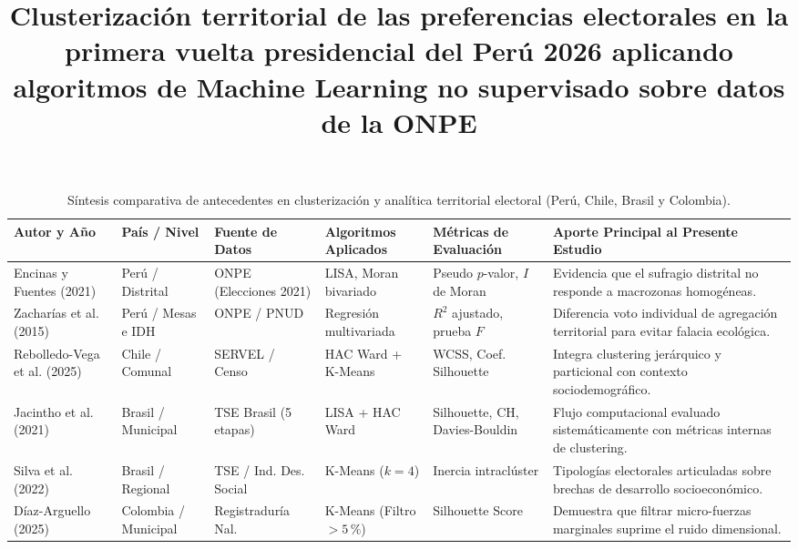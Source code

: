 \documentclass[conference,10pt,letterpaper]{IEEEtran}
\begin{document}
\title{Clusterización territorial de las preferencias electorales en la primera vuelta presidencial del Perú 2026 aplicando algoritmos de Machine Learning no supervisado sobre datos de la ONPE}

\author{
}

\maketitle
\begin{table}[t]
\centering
\caption{Síntesis comparativa de antecedentes en clusterización y analítica territorial electoral (Perú, Chile, Brasil y Colombia).}
\label{tab:antecedentes}
\scriptsize
\renewcommand{\arraystretch}{0.92}
\begin{tabularx}{\textwidth}{@{} l p{2.3cm} p{2.4cm} p{2.5cm} p{2.4cm} X @{}}
\toprule
\textbf{Autor y Año} & \textbf{País / Nivel} & \textbf{Fuente de Datos} & \textbf{Algoritmos Aplicados} & \textbf{Métricas de Evaluación} & \textbf{Aporte Principal al Presente Estudio} \\
\midrule
Encinas y Fuentes (2021) \cite{encinas2021} & Perú / Distrital & ONPE (Elecciones 2021) & LISA, Moran bivariado & Pseudo $p$-valor, $I$ de Moran & Evidencia que el sufragio distrital no responde a macrozonas homogéneas. \\
Zacharías et al. (2015) \cite{zacharias2015} & Perú / Mesas e IDH & ONPE / PNUD & Regresión multivariada & $R^2$ ajustado, prueba $F$ & Diferencia voto individual de agregación territorial para evitar falacia ecológica. \\
Rebolledo-Vega et al. (2025) \cite{rebolledo2025} & Chile / Comunal & SERVEL / Censo & HAC Ward + K-Means & WCSS, Coef. Silhouette & Integra clustering jerárquico y particional con contexto sociodemográfico. \\
Jacintho et al. (2021) \cite{jacintho2021} & Brasil / Municipal & TSE Brasil (5 etapas) & LISA + HAC Ward & Silhouette, CH, Davies-Bouldin & Flujo computacional evaluado sistemáticamente con métricas internas de clustering. \\
Silva et al. (2022) \cite{silva2022} & Brasil / Regional & TSE / Ind. Des. Social & K-Means ($k = 4$) & Inercia intraclúster & Tipologías electorales articuladas sobre brechas de desarrollo socioeconómico. \\
Díaz-Arguello (2025) \cite{diaz2025} & Colombia / Municipal & Registraduría Nal. & K-Means (Filtro $> 5\,\%$) & Silhouette Score & Demuestra que filtrar micro-fuerzas marginales suprime el ruido dimensional. \\
\bottomrule
\end{tabularx}
\end{table}
\end{document}
